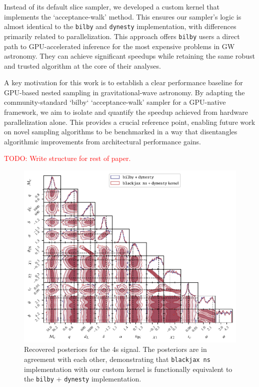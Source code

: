 \documentclass[fleqn,usenatbib]{mnras}
\begin{document}
Instead of its default slice sampler, we developed a custom
kernel that implements the `acceptance-walk' method. This
ensures our sampler's logic is almost identical to the
\texttt{bilby} and \texttt{dynesty} implementation, with differences
primarily related to parallelization. This approach offers
\texttt{bilby} users a direct path to GPU-accelerated inference for the most expensive problems in GW astronomy.
They can achieve significant speedups while retaining the same
robust and trusted algorithm at the core of their analyses.

A key motivation for this work is to establish a clear performance
baseline for GPU-based nested sampling in gravitational-wave astronomy.
By adapting the community-standard `bilby`
`acceptance-walk' sampler for a GPU-native framework, we aim to isolate
and quantify the speedup achieved from hardware parallelization alone.
This provides a crucial reference point, enabling future work on novel
sampling algorithms to be benchmarked in a way that disentangles
algorithmic improvements from architectural performance gains.

\textcolor{red}{TODO: Write structure for rest of paper.}

\begin{figure}
    \centering
    \includegraphics{figures/bilby_blackjax_comparison_4s.pdf}
    \caption{Recovered posteriors for the 4s signal. The posteriors are in agreement with each other, demonstrating that
    \texttt{blackjax ns} implementation with our custom kernel is functionally equivalent to the \texttt{bilby} + \texttt{dynesty} implementation.}
    \label{fig:4s_posteriors}
\end{figure}
\end{document}
